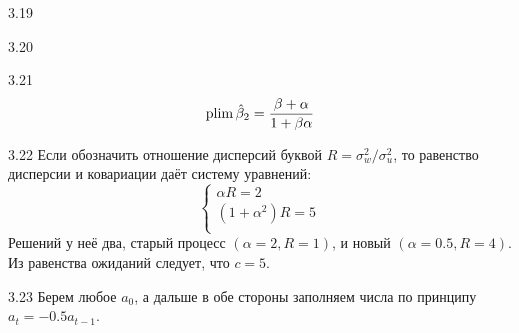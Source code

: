 \protect \hypertarget {soln:3.19}{}
\begin{solution}{{3.19}}
  
\end{solution}
\protect \hypertarget {soln:3.20}{}
\begin{solution}{{3.20}}
  
\end{solution}
\protect \hypertarget {soln:3.21}{}
\begin{solution}{{3.21}}
    \[
    \operatorname{plim} \hat \beta_2 = \frac{\beta + \alpha}{1 + \beta \alpha}
    \]
  
\end{solution}
\protect \hypertarget {soln:3.22}{}
\begin{solution}{{3.22}}
Если обозначить отношение дисперсий буквой $R = \sigma^2_w/\sigma^2_u$,
то равенство дисперсии и ковариации даёт систему уравнений:
\[
  \begin{cases}
    \alpha R = 2 \\
    (1+\alpha^2)R = 5 \\
  \end{cases}
\]
Решений у неё два, старый процесс $(\alpha=2, R=1)$, и новый $(\alpha=0.5, R=4)$.
Из равенства ожиданий следует, что $c=5$.
  
\end{solution}
\protect \hypertarget {soln:3.23}{}
\begin{solution}{{3.23}}
    Берем любое $a_0$, а дальше в обе стороны заполняем числа по принципу $a_t = -0.5 a_{t-1}$.
  
\end{solution}
\protect \hypertarget {soln:3.24}{}

